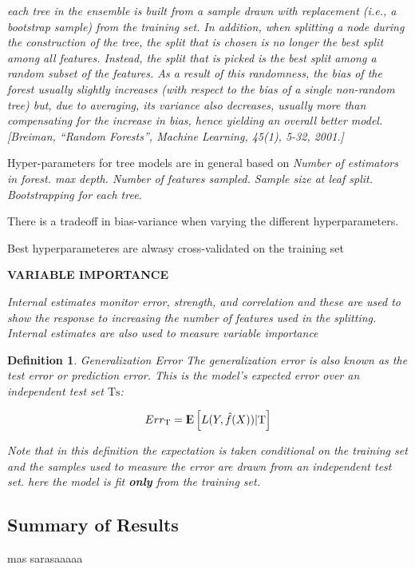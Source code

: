 \documentclass{article}%
\newcommand{\Expect}{{\rm I\kern-.3em E}}
\newtheorem{definition}{Definition}[subsection]
\theoremstyle{definition}
\begin{document}
	\textit{each tree in the ensemble is built from a sample drawn with replacement (i.e., a bootstrap sample) from the training set. In addition, when splitting a node during the construction of the tree, the split that is chosen is no longer the best split among all features. Instead, the split that is picked is the best split among a random subset of the features. As a result of this randomness, the bias of the forest usually slightly increases (with respect to the bias of a single non-random tree) but, due to averaging, its variance also decreases, usually more than compensating for the increase in bias, hence yielding an overall better model. [Breiman, “Random Forests”, Machine Learning, 45(1), 5-32, 2001.] }
	
	
	Hyper-parameters for tree models are in general based on 
	\textit{Number of estimators in forest. max depth. Number of features sampled. Sample size at leaf split. Bootstrapping for each tree. }
	
	There is a tradeoff in bias-variance when varying the different hyperparameters.
	
	Best hyperparameteres are alwasy cross-validated on the training set
	
	\textbf{VARIABLE IMPORTANCE}
	
	\textit{Internal estimates monitor error, strength, and correlation and these are used to show
		the response to increasing the number of features used in the splitting. Internal estimates are also used to measure variable importance}


\begin{definition}{Generalization Error}
	The generalization error is also known as the test error or prediction error. This is the model's expected error over an independent test set $\mathrm{Ts}$:
	
	$$ Err_{\mathrm{T}} = \Expect \left[ L(Y,\hat{f}(X)) |  \mathrm{T}\right]$$
	
	Note that in this definition the expectation is taken conditional on the training set and the samples used to measure the error are drawn from an independent test set. here the model is fit \textbf{only} from the training set.
\end{definition}


\subsection{Summary of Results}

mas sarasaaaaa
\end{document}
